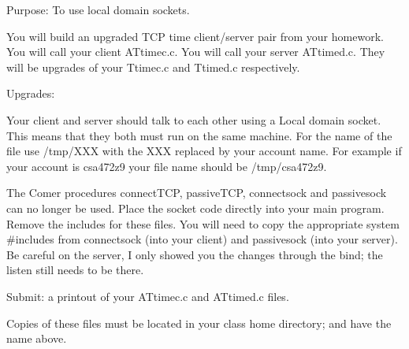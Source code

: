 

\parindent 0pt

Purpose: To use local domain sockets.

You will build an upgraded TCP time client/server pair
from your homework.
You will call your client {\ltt{}ATtimec.c}.
You will call your server {\ltt{}ATtimed.c}.
They will be upgrades of your {\ltt{}Ttimec.c} and {\ltt{}Ttimed.c}
respectively.

Upgrades:

Your client and server should talk to each other using a Local domain
socket.
This means that they both must run on the same machine.
For the name of the file use {\ltt{}/tmp/XXX} with the {\ltt{}XXX}
replaced by your account name. For example if your account
is {\ltt{}csa472z9} your file name should be {\ltt{}/tmp/csa472z9}.

The Comer procedures {\ltt{}connectTCP}, {\ltt{}passiveTCP},
{\ltt{}connectsock} and {\ltt{}passivesock}
can no longer be used.
Place the socket code directly into your main program.
Remove the includes for these files.
You will need to copy the appropriate
system {\ltt{}#include}s from {\ltt{}connectsock} (into your client)
and {\ltt{}passivesock} (into your server).
Be careful on the server, I only showed you the changes through the
{\ltt{}bind}; the {\ltt{}listen} still needs to be there.

Submit: a printout of your {\ltt{}ATtimec.c} and {\ltt{}ATtimed.c} files.

Copies of these files must be located in your class home directory;
and have the name above.

\bye
